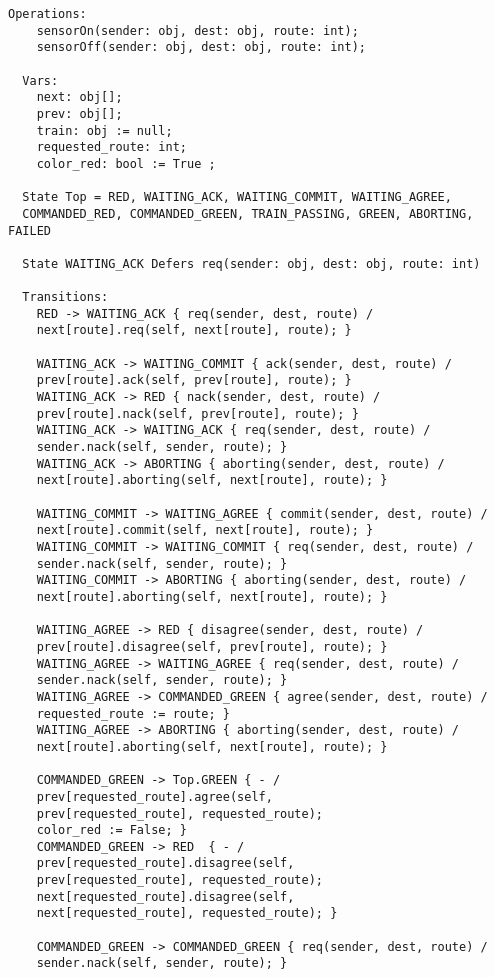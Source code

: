 \begin{lstlisting}[caption={modello della classe Switch}]
  Operations:
    sensorOn(sender: obj, dest: obj, route: int);  
    sensorOff(sender: obj, dest: obj, route: int);

  Vars:
    next: obj[];             
    prev: obj[];             
    train: obj := null;      
    requested_route: int;
    color_red: bool := True ;          

  State Top = RED, WAITING_ACK, WAITING_COMMIT, WAITING_AGREE, 
  COMMANDED_RED, COMMANDED_GREEN, TRAIN_PASSING, GREEN, ABORTING, FAILED
  
  State WAITING_ACK Defers req(sender: obj, dest: obj, route: int)

  Transitions:
    RED -> WAITING_ACK { req(sender, dest, route) / 
    next[route].req(self, next[route], route); }

    WAITING_ACK -> WAITING_COMMIT { ack(sender, dest, route) / 
    prev[route].ack(self, prev[route], route); }
    WAITING_ACK -> RED { nack(sender, dest, route) / 
    prev[route].nack(self, prev[route], route); }
    WAITING_ACK -> WAITING_ACK { req(sender, dest, route) / 
    sender.nack(self, sender, route); }
    WAITING_ACK -> ABORTING { aborting(sender, dest, route) / 
    next[route].aborting(self, next[route], route); }

    WAITING_COMMIT -> WAITING_AGREE { commit(sender, dest, route) / 
    next[route].commit(self, next[route], route); }
    WAITING_COMMIT -> WAITING_COMMIT { req(sender, dest, route) / 
    sender.nack(self, sender, route); }
    WAITING_COMMIT -> ABORTING { aborting(sender, dest, route) / 
    next[route].aborting(self, next[route], route); }

    WAITING_AGREE -> RED { disagree(sender, dest, route) / 
    prev[route].disagree(self, prev[route], route); }
    WAITING_AGREE -> WAITING_AGREE { req(sender, dest, route) / 
    sender.nack(self, sender, route); }
    WAITING_AGREE -> COMMANDED_GREEN { agree(sender, dest, route) / 
    requested_route := route; }
    WAITING_AGREE -> ABORTING { aborting(sender, dest, route) / 
    next[route].aborting(self, next[route], route); }

    COMMANDED_GREEN -> Top.GREEN { - / 
    prev[requested_route].agree(self, 
    prev[requested_route], requested_route); 
    color_red := False; }
    COMMANDED_GREEN -> RED  { - / 
    prev[requested_route].disagree(self, 
    prev[requested_route], requested_route); 
    next[requested_route].disagree(self, 
    next[requested_route], requested_route); }
    
    COMMANDED_GREEN -> COMMANDED_GREEN { req(sender, dest, route) / 
    sender.nack(self, sender, route); }
    

\end{lstlisting}
